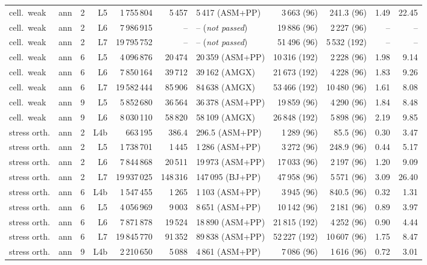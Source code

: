 \begin{tabular}{llrrrrlrrrr}
cell.\ weak & ann & 2 & L5 & 1\,755\,804 & 5\,457 & 5\,417 (ASM+PP) & 3\,663 (96) & 241.3 (96) & 1.49 & 22.45\\
cell.\ weak & ann & 2 & L6 & 7\,986\,915 & -- & -- (\emph{not passed}) & 19\,886 (96) & 2\,227 (96) & -- & --\\
cell.\ weak & ann & 2 & L7 & 19\,795\,752 & -- & -- (\emph{not passed}) & 51\,496 (96) & 5\,532 (192) & -- & --\\
cell.\ weak & ann & 6 & L5 & 4\,096\,876 & 20\,474 & 20\,359 (ASM+PP) & 10\,316 (192) & 2\,228 (96) & 1.98 & 9.14\\
cell.\ weak & ann & 6 & L6 & 7\,850\,164 & 39\,712 & 39\,162 (AMGX) & 21\,673 (192) & 4\,228 (96) & 1.83 & 9.26\\
cell.\ weak & ann & 6 & L7 & 19\,582\,444 & 85\,906 & 84\,638 (AMGX) & 53\,466 (192) & 10\,480 (96) & 1.61 & 8.08\\
cell.\ weak & ann & 9 & L5 & 5\,852\,680 & 36\,564 & 36\,378 (ASM+PP) & 19\,859 (96) & 4\,290 (96) & 1.84 & 8.48\\
cell.\ weak & ann & 9 & L6 & 8\,030\,110 & 58\,820 & 58\,109 (AMGX) & 26\,848 (192) & 5\,898 (96) & 2.19 & 9.85\\
stress orth. & ann & 2 & L4b & 663\,195 & 386.4 & 296.5 (ASM+PP) & 1\,289 (96) & 85.5 (96) & 0.30 & 3.47\\
stress orth. & ann & 2 & L5 & 1\,738\,701 & 1\,445 & 1\,286 (ASM+PP) & 3\,272 (96) & 248.9 (96) & 0.44 & 5.17\\
stress orth. & ann & 2 & L6 & 7\,844\,868 & 20\,511 & 19\,973 (ASM+PP) & 17\,033 (96) & 2\,197 (96) & 1.20 & 9.09\\
stress orth. & ann & 2 & L7 & 19\,937\,025 & 148\,316 & 147\,095 (BJ+PP) & 47\,958 (96) & 5\,571 (96) & 3.09 & 26.40\\
stress orth. & ann & 6 & L4b & 1\,547\,455 & 1\,265 & 1\,103 (ASM+PP) & 3\,945 (96) & 840.5 (96) & 0.32 & 1.31\\
stress orth. & ann & 6 & L5 & 4\,056\,969 & 9\,003 & 8\,651 (ASM+PP) & 10\,142 (96) & 2\,181 (96) & 0.89 & 3.97\\
stress orth. & ann & 6 & L6 & 7\,871\,878 & 19\,524 & 18\,890 (ASM+PP) & 21\,815 (192) & 4\,252 (96) & 0.90 & 4.44\\
stress orth. & ann & 6 & L7 & 19\,845\,770 & 91\,352 & 89\,838 (ASM+PP) & 52\,227 (192) & 10\,607 (96) & 1.75 & 8.47\\
stress orth. & ann & 9 & L4b & 2\,210\,650 & 5\,088 & 4\,861 (ASM+PP) & 7\,086 (96) & 1\,616 (96) & 0.72 & 3.01\\

\end{tabular}
